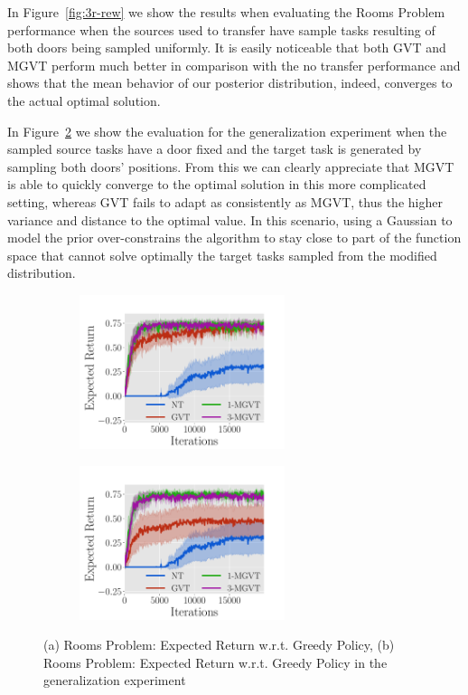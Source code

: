 \documentclass{article}
\begin{document}
In Figure~\ref{fig:3r-rew} we show the results when evaluating the Rooms Problem performance when the sources used to transfer have sample tasks resulting of both doors being sampled uniformly. It is easily noticeable that both GVT and MGVT perform much better in comparison with the no transfer performance and shows that the mean behavior of our posterior distribution, indeed, converges to the actual optimal solution.

In Figure~\ref{fig:3rg-erew} we show the evaluation for the generalization experiment when the sampled source tasks have a door fixed and the target task is generated by sampling both doors' positions. From this we can clearly appreciate that MGVT is able to quickly converge to the optimal solution in this more complicated setting, whereas GVT fails to adapt as consistently as MGVT, thus the higher variance and distance to the optimal value. In this scenario, using a Gaussian to model the prior over-constrains the algorithm to stay close to part of the function space that cannot solve optimally the target tasks sampled from the modified distribution.

\begin{figure}[t]
  \begin{subfigure}[b]{0.45\textwidth}
    \includegraphics[trim=0.3cm 0cm 1.8cm 1.3cm,clip=true,height=4.5cm]{images/three-room/erew.pdf}
    \caption{}
    \label{fig:3r-erew}
  \end{subfigure}
  \begin{subfigure}[b]{0.45\textwidth}
    \includegraphics[trim=0.3cm 0cm 1.8cm 1.3cm,clip=true,height=4.5cm]{images/three-room-gen/erew.pdf}
    \caption{}
    \label{fig:3rg-erew}
  \end{subfigure}
  \caption{(a) Rooms Problem: Expected Return w.r.t. Greedy Policy, (b) Rooms Problem: Expected Return w.r.t. Greedy Policy in the generalization experiment}
  \label{fig:rooms-erew}
\end{figure}
\end{document}
